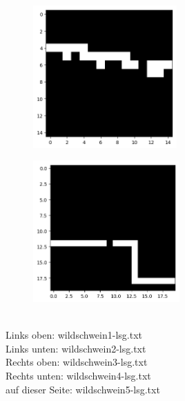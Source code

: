 \documentclass[a4paper, notitlepage, 12pt]{scrartcl}
\begin{document}
\begin{multicols}{2}
\begin{figure}[H]
\centering \includegraphics[width=0.49\textwidth]{pics/wildschwein4-lsg-top_to_bot_bool.png}
\end{figure}

\begin{figure}[H]
\centering \includegraphics[width=0.5\textwidth]{pics/wildschwein5-lsg-top_to_bot_bool.png}
\end{figure}
\columnbreak
~\\
Links oben: wildschwein1-lsg.txt \\
Links unten: wildschwein2-lsg.txt \\
Rechts oben: wildschwein3-lsg.txt \\
Rechts unten: wildschwein4-lsg.txt \\
auf dieser Seite: wildschwein5-lsg.txt \\
\end{multicols}
\end{document}
